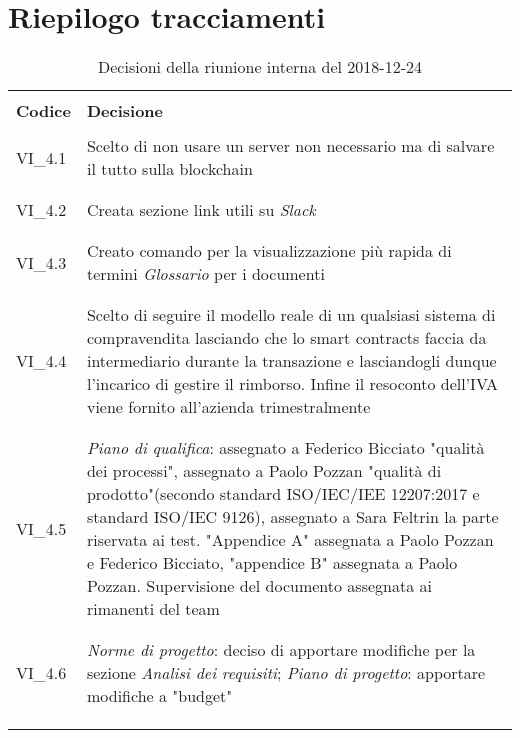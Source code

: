 \section{Riepilogo tracciamenti}
\begin{centering}
\begin{longtable}{ >{\centering}p{4cm} >{\centering}p{11cm} }

\hline
\\[0.5pt]
	\textbf{Codice} & \textbf{Decisione} 
	
	\tabularnewline 
	\hline
						
				\\[0.5pt]
				VI\_4.1 & Scelto di non usare un server non necessario ma di 
				salvare il tutto sulla blockchain
				\\[0.5pt]
				\tabularnewline
				\hline
				
				\\[0.5pt]
				VI\_4.2 & Creata sezione link utili su \textit{Slack}
				\\[0.5pt]
				\tabularnewline
				\hline
				
				\\[0.5pt]				
				VI\_4.3 & Creato comando per la visualizzazione più rapida di 
				termini \textit{Glossario} per i documenti
				\\[0.5pt]
				\tabularnewline
				\hline
				
				\\[0.5pt]
				VI\_4.4 & Scelto di seguire il modello reale di un qualsiasi 
				sistema di compravendita lasciando che lo smart contracts 
				faccia da intermediario durante la transazione e lasciandogli 
				dunque l'incarico di gestire il rimborso. Infine il resoconto 
				dell'IVA viene fornito all'azienda trimestralmente
				\\[0.5pt]
				\tabularnewline
				\hline
				
				\\[0.5pt]
				VI\_4.5 & \textit{Piano di qualifica}: assegnato a Federico 
				Bicciato "qualità dei processi", assegnato a Paolo Pozzan 
				"qualità di prodotto"(secondo standard ISO/IEC/IEE 12207:2017 e 
				standard ISO/IEC 9126), assegnato a Sara Feltrin la parte 
				riservata ai test. "Appendice A" assegnata a Paolo Pozzan e 
				Federico Bicciato, "appendice B" assegnata a Paolo Pozzan. 
				Supervisione del documento assegnata ai rimanenti del team
				\\[0.5pt]
				\tabularnewline
				\hline
		
				\\[0.5pt]
				VI\_4.6 & \textit{Norme di progetto}: deciso di apportare 
				modifiche per la sezione \textit{Analisi dei requisiti}; 
				\textit{Piano di progetto}: apportare modifiche a "budget"
				\\[0.5pt]
				\tabularnewline
				\hline          	
                
        \\[0.7pt]
        \caption{Decisioni della riunione interna del 2018-12-24}
\end{longtable}
\end{centering}

